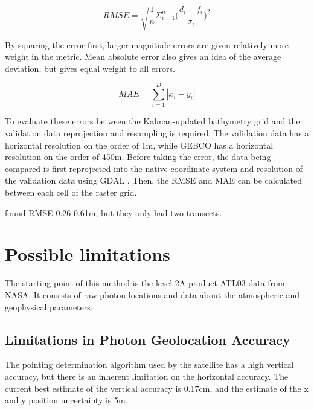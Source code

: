 $$  RMSE = \sqrt{\frac{1}{n}\Sigma_{i=1}^{n}{\Big(\frac{d_i -f_i}{\sigma_i}\Big)^2}}  $$

By squaring the error first, larger magnitude errors are given relatively more weight in the metric. Mean absolute error also gives an idea of the average deviation, but gives equal weight to all errors.

$$ MAE = \sum_{i=1}^{D}|x_i-y_i| $$

To evaluate these errors between the Kalman-updated bathymetry grid and the validation data reprojection and resampling is required. The validation data has a horizontal resolution on the order of 1m, while GEBCO has a horizontal resolution on the order of 450m. Before taking the error, the data being compared is first reprojected into the native coordinate system and resolution of the validation data using GDAL \parencite{rouault_even_2022_6352176}. Then, the RMSE and MAE can be calculated between each cell of the raster grid.


\citeauthor{Hsu2021} found RMSE 0.26-0.61m, but they only had two transects.

\section{Possible limitations}

The starting point of this method is the level 2A product ATL03 data from NASA. It consists of raw photon locations and data about the atmospheric and geophysical parameters. 

\subsection{Limitations in Photon Geolocation Accuracy}

The pointing determination algorithm used by the satellite has a high vertical accuracy, but there is an inherent limitation on the horizontal accuracy. The current best estimate of the vertical accuracy is 0.17cm, and the estimate of the x and y position uncertainty is 5m..

